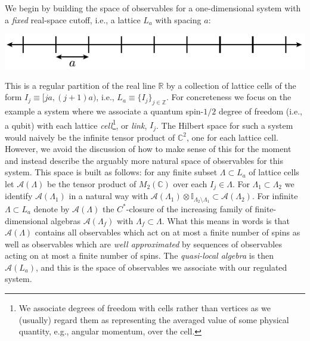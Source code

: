 \documentclass[11pt]{amsart}
\theoremstyle{plain}%
\theoremstyle{definition}
\theoremstyle{remark}
\begin{document}
We begin by building the space of observables for a one-dimensional system with a \emph{fixed} real-space cutoff, i.e., a lattice $L_a$ with spacing $a$: 
\begin{center}
	\includegraphics{lattice.pdf}
\end{center}
This is a regular partition of the real line $\mathbb{R}$ by a collection of lattice cells of the form $I_j \equiv [ja, (j+1)a)$, i.e., $L_a \equiv \{I_j\}_{j\in \mathbb{Z}}$. For concreteness we focus on the example a system where we associate a quantum spin-$1/2$ degree of freedom (i.e., a qubit) with each lattice \emph{cell}\footnote{We associate degrees of freedom with cells rather than vertices as we (usually) regard them as representing the averaged value of some physical quantity, e.g., angular momentum, over the cell.}, or \emph{link}, $I_j$. The Hilbert space for such a system would naively be the infinite tensor product of $\mathbb{C}^2$, one for each lattice cell. However, we avoid the discussion of how to make sense of this for the moment and instead describe the arguably more natural space of observables for this system. This space is built as follows: for any finite subset $\Lambda \subset L_a$ of lattice cells let $\mathcal{A}(\Lambda)$ be the tensor product of $M_2(\mathbb{C})$ over each $I_j\in \Lambda$. For $\Lambda_1\subset \Lambda_2$ we identify $\mathcal{A}(\Lambda_1)$ in a natural way with $\mathcal{A}(\Lambda_1)\otimes \mathbb{I}_{\Lambda_2\setminus \Lambda_1} \subset \mathcal{A}(\Lambda_2)$. For infinite $\Lambda \subset L_a$ denote by $\mathcal{A}(\Lambda)$ the $C^*$-closure of the increasing family of finite-dimensional algebras $\mathcal{A}(\Lambda_f)$ with $\Lambda_f \subset \Lambda$. What this means in words is that $\mathcal{A}(\Lambda)$ contains all observables which act on at most a finite number of spins as well as observables which are \emph{well approximated} by sequences of observables acting on at most a finite number of spins. The \emph{quasi-local algebra} is then $\mathcal{A}(L_a)$, and this is the space of observables we associate with our regulated system. 
\end{document}
